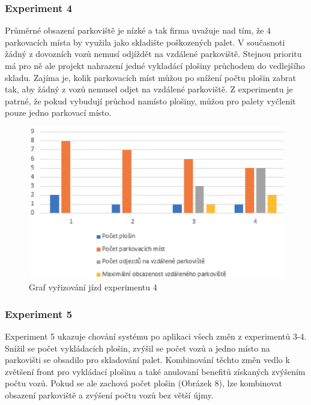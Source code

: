 \documentclass[a4paper, 11pt]{article}
\begin{document}
\subsubsection{Experiment 4}
Průměrné obsazení parkoviště je nízké a tak firma uvažuje nad tím, že 4 parkovacích místa by využila jako skladište poškozených palet. V současnoti žádný z dovozních vozů nemusí odjíždět na vzdálené parkoviště. Stejnou prioritu má pro ně ale projekt nahrazení jedné vykladácí plošiny průchodem do vedlejšího skladu. Zajíma je, kolik parkovacích míst můžou po snížení počtu plošin zabrat tak, aby žádný z vozů nemusel odjet na vzdálené parkoviště. Z experimentu je patrné, 
že pokud vybudují průchod namísto plošiny, můžou pro palety vyčlenit pouze jedno parkovací místo.

\begin{figure}[h!]
\begin{center}
\includegraphics[scale=0.75]{exp4.eps}
\caption{Graf vyřizování jízd experimentu 4}
\end{center}
\end{figure}
\newpage

\subsubsection{Experiment 5}
Experiment 5 ukazuje chování systému po aplikaci všech změn z experimentů 3-4.
Snížil se počet vykládacích plošin, zvýšil se počet vozů a jedno místo na parkovišti se obsadilo pro skladování palet. Kombinování těchto změn vedlo k zvětšení front pro vykládací plošinu a také anulovaní benefitů získaných zvýšením počtu vozů. Pokud se ale zachová počet plošin (Obrázek 8), lze kombinovat obsazení parkoviště a zvýšení počtu vozů bez větší újmy. \\
\end{document}
